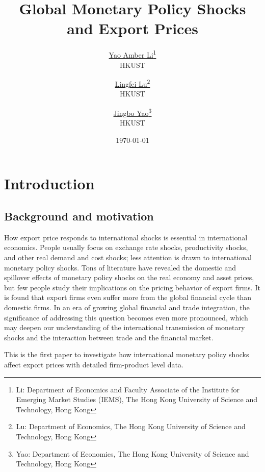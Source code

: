 \documentclass[12pt]{article}
\begin{document}
\title{\Large \textbf{Global Monetary Policy Shocks and Export Prices}}

\author{\large \href{http://yaoli.people.ust.hk/}{Yao Amber Li}\thanks{Li: Department of Economics and Faculty Associate of the Institute for Emerging Market Studies (IEMS), The Hong Kong University of Science and Technology, Hong Kong}\\ \large{HKUST}
\medskip
\and \href{}{Lingfei Lu}\thanks{Lu: Department of Economics, The Hong Kong University of Science and Technology, Hong Kong } \\ \large{HKUST}
\medskip
\and \href{}{Jingbo Yao}\thanks{Yao: Department of Economics, The Hong Kong University of Science and Technology, Hong Kong} \\ \large{HKUST}
}
\date{\today}

\maketitle

\tableofcontents
\newpage

\section{Introduction}



\subsection{Background and motivation}

How export price responds to international shocks is essential in international economics. People usually focus on exchange rate shocks, productivity shocks, and other real demand and cost shocks; less attention is drawn to international monetary policy shocks. Tons of literature have revealed the domestic and spillover effects of monetary policy shocks on the real economy and asset prices, but few people study their implications on the pricing behavior of export firms. It is found that export firms even suffer more from the global financial cycle than domestic firms. In an era of growing global financial and trade integration, the significance of addressing this question becomes even more pronounced, which may deepen our understanding of the international transmission of monetary shocks and the interaction between trade and the financial market.

This is the first paper to investigate how international monetary policy shocks affect export prices with detailed firm-product level data. 
\end{document}
